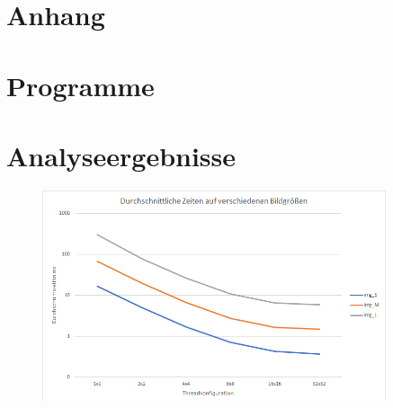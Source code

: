 \documentclass[12pt,a4paper]{scrartcl}
\begin{document}
\newpage
\section{Anhang}
\appendix
\label{anhang}

\section{Programme}
 \newpage
 \newpage
 \newpage
 \newpage
 \newpage
 \newpage


\section{Analyseergebnisse}
\label{ergebnisse}
\begin{figure}[h]
    \caption{}
    \includegraphics[width=0.9\textwidth]{times(size).png}
    \label{fig:timesize}
\end{figure}
\end{document}
